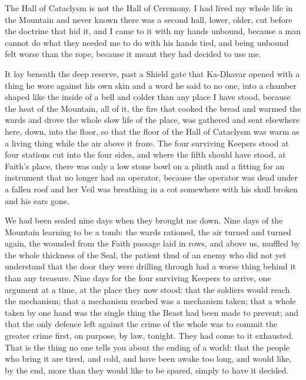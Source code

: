 
The Hall of Cataclysm is not the Hall of Ceremony. I had lived my whole life in the Mountain and never known there was a second hall, lower, older, cut before the doctrine that hid it, and I came to it with my hands unbound, because a man cannot do what they needed me to do with his hands tied, and being unbound felt worse than the rope, because it meant they had decided to use me.\par

It lay beneath the deep reserve, past a Shield gate that Ka-Dhavar opened with a thing he wore against his own skin and a word he said to no one, into a chamber shaped like the inside of a bell and colder than any place I have stood, because the heat of the Mountain, all of it, the fire that cooked the bread and warmed the wards and drove the whole slow life of the place, was gathered and sent elsewhere here, down, into the floor, so that the floor of the Hall of Cataclysm was warm as a living thing while the air above it froze. The four surviving Keepers stood at four stations cut into the four sides, and where the fifth should have stood, at Faith's place, there was only a low stone bowl on a plinth and a fitting for an instrument that no longer had an operator, because the operator was dead under a fallen roof and her Veil was breathing in a cot somewhere with his skull broken and his ears gone.\par

We had been sealed nine days when they brought me down. Nine days of the Mountain learning to be a tomb: the wards rationed, the air turned and turned again, the wounded from the Faith passage laid in rows, and above us, muffled by the whole thickness of the Seal, the patient thud of an enemy who did not yet understand that the door they were drilling through had a worse thing behind it than any treasure. Nine days for the four surviving Keepers to arrive, one argument at a time, at the place they now stood: that the soldiers would reach the mechanism; that a mechanism reached was a mechanism taken; that a whole taken by one hand was the single thing the Beast had been made to prevent; and that the only defence left against the crime of the whole was to commit the greater crime first, on purpose, by law, tonight. They had come to it exhausted. That is the thing no one tells you about the ending of a world: that the people who bring it are tired, and cold, and have been awake too long, and would like, by the end, more than they would like to be spared, simply to have it decided.\par

